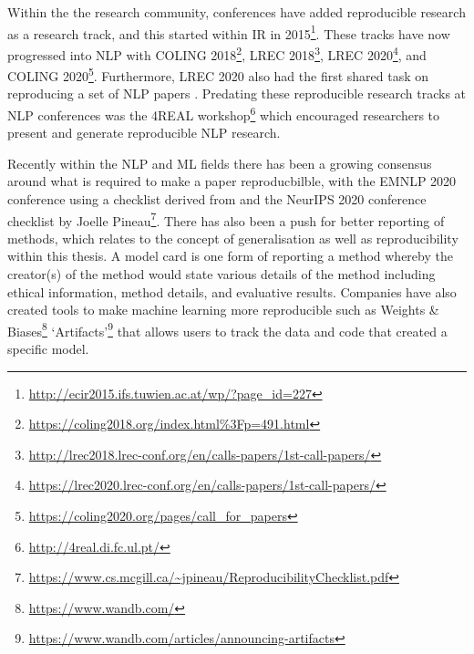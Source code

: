 Within the the research community, conferences have added reproducible research as a research track, and this started within IR in 2015\footnote{\url{http://ecir2015.ifs.tuwien.ac.at/wp/?page_id=227}}. These tracks have now progressed into NLP with COLING 2018\footnote{\url{https://coling2018.org/index.html\%3Fp=491.html}}, LREC 2018\footnote{\url{http://lrec2018.lrec-conf.org/en/calls-papers/1st-call-papers/}}, LREC 2020\footnote{\url{https://lrec2020.lrec-conf.org/en/calls-papers/1st-call-papers/}}, and COLING 2020\footnote{\url{https://coling2020.org/pages/call_for_papers}}. Furthermore, LREC 2020 also had the first shared task on reproducing a set of NLP papers \citep{branco-etal-2020-shared}. Predating these reproducible research tracks at NLP conferences was the 4REAL workshop\footnote{\url{http://4real.di.fc.ul.pt/}} which encouraged researchers to present and generate reproducible NLP research.


Recently within the NLP and ML fields there has been a growing consensus around what is required to make a paper reproducbilble, with the EMNLP 2020 conference using a checklist derived from \citet{dodge-etal-2019-show} and the NeurIPS 2020 conference checklist by Joelle Pineau\footnote{\url{https://www.cs.mcgill.ca/~jpineau/ReproducibilityChecklist.pdf}}. There has also been a push for better reporting of methods, which relates to the concept of generalisation as well as reproducibility within this thesis. A model card \citep{mitchell2019model} is one form of reporting a method whereby the creator(s) of the method would state various details of the method including ethical information, method details, and evaluative results. Companies have also created tools to make machine learning more reproducible such as Weights \& Biases\footnote{\url{https://www.wandb.com/}} `Artifacts'\footnote{\url{https://www.wandb.com/articles/announcing-artifacts}} that allows users to track the data and code that created a specific model.









